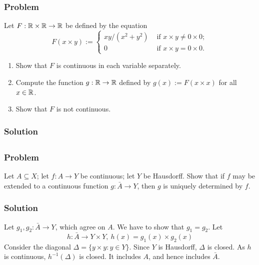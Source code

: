 \subsubsection{Problem}
Let $F : \mathbb R \times \mathbb R \to \mathbb R$ be defined by the equation
\[ F(x \times y) := 
\left\{ \begin{array}{ll}
    xy/(x^2+y^2) & \mbox{ if } x \times y \neq 0 \times 0 ; \\
    0 & \mbox{ if } x \times y = 0 \times 0.
\end{array} \right. \]
\begin{enumerate}
    \item Show that $F$ is continuous in each variable separately.
    \item Compute the function $g : \mathbb R \to \mathbb R$ defined by $g(x) := F(x \times x)$ for all $x \in \mathbb R$.
    \item Show that $F$ is not continuous.
\end{enumerate}

\subsubsection{Solution}
\todo


\subsection{}

\subsubsection{Problem}
Let $A \subseteq X$; let $f : A \to Y$ be continuous; let $Y$ be Hausdorff. Show that if $f$ may be extended to a continuous function $g : \bar A \to Y$, then $g$ is uniquely determined by $f$.

\subsubsection{Solution}
Let $g_1, g_2 : \bar A \to Y$, which agree on $A$. We have to show that $g_1 = g_2$. Let
\[h : \bar A \to Y \times Y,\ h(x) = g_1(x) \times g_2(x) \]
Consider the diagonal $\Delta = \{ y \times y : y \in Y\}$. Since $Y$ is Hausdorff, $\Delta$ is closed. As $h$ is continuous, $h^{-1}(\Delta)$ is closed. It includes $A$, and hence includes $\bar A$.
